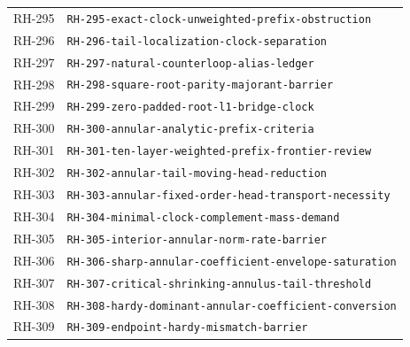 \begin{longtable}{r >{\raggedright\arraybackslash}p{}}
RH-295 & \texttt{RH-\allowbreak{}295-\allowbreak{}exact-\allowbreak{}clock-\allowbreak{}unweighted-\allowbreak{}prefix-\allowbreak{}obstruction}\\
RH-296 & \texttt{RH-\allowbreak{}296-\allowbreak{}tail-\allowbreak{}localization-\allowbreak{}clock-\allowbreak{}separation}\\
RH-297 & \texttt{RH-\allowbreak{}297-\allowbreak{}natural-\allowbreak{}counterloop-\allowbreak{}alias-\allowbreak{}ledger}\\
RH-298 & \texttt{RH-\allowbreak{}298-\allowbreak{}square-\allowbreak{}root-\allowbreak{}parity-\allowbreak{}majorant-\allowbreak{}barrier}\\
RH-299 & \texttt{RH-\allowbreak{}299-\allowbreak{}zero-\allowbreak{}padded-\allowbreak{}root-\allowbreak{}l1-\allowbreak{}bridge-\allowbreak{}clock}\\
RH-300 & \texttt{RH-\allowbreak{}300-\allowbreak{}annular-\allowbreak{}analytic-\allowbreak{}prefix-\allowbreak{}criteria}\\
RH-301 & \texttt{RH-\allowbreak{}301-\allowbreak{}ten-\allowbreak{}layer-\allowbreak{}weighted-\allowbreak{}prefix-\allowbreak{}frontier-\allowbreak{}review}\\
RH-302 & \texttt{RH-\allowbreak{}302-\allowbreak{}annular-\allowbreak{}tail-\allowbreak{}moving-\allowbreak{}head-\allowbreak{}reduction}\\
RH-303 & \texttt{RH-\allowbreak{}303-\allowbreak{}annular-\allowbreak{}fixed-\allowbreak{}order-\allowbreak{}head-\allowbreak{}transport-\allowbreak{}necessity}\\
RH-304 & \texttt{RH-\allowbreak{}304-\allowbreak{}minimal-\allowbreak{}clock-\allowbreak{}complement-\allowbreak{}mass-\allowbreak{}demand}\\
RH-305 & \texttt{RH-\allowbreak{}305-\allowbreak{}interior-\allowbreak{}annular-\allowbreak{}norm-\allowbreak{}rate-\allowbreak{}barrier}\\
RH-306 & \texttt{RH-\allowbreak{}306-\allowbreak{}sharp-\allowbreak{}annular-\allowbreak{}coefficient-\allowbreak{}envelope-\allowbreak{}saturation}\\
RH-307 & \texttt{RH-\allowbreak{}307-\allowbreak{}critical-\allowbreak{}shrinking-\allowbreak{}annulus-\allowbreak{}tail-\allowbreak{}threshold}\\
RH-308 & \texttt{RH-\allowbreak{}308-\allowbreak{}hardy-\allowbreak{}dominant-\allowbreak{}annular-\allowbreak{}coefficient-\allowbreak{}conversion}\\
RH-309 & \texttt{RH-\allowbreak{}309-\allowbreak{}endpoint-\allowbreak{}hardy-\allowbreak{}mismatch-\allowbreak{}barrier}\\

\end{longtable}
